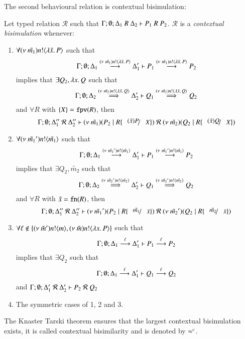 The second behavioural relation is contextual bisimulation:
%
\begin{definition}\rm
	Let typed relation $\mathcal{R}$ such that
	$\horel{\Gamma}{\Delta_1}{P_1}{\ R\ }{\Delta_2}{P_2}$.
	$\mathcal{R}$ is a {\em contextual bisimulation} whenever:
	\begin{enumerate}
		\item	$\forall \news{\tilde{m_1}} \bactout{n}{\abs{\tilde{x}}{P}}$ such that
			\[
				\horel{\Gamma}{\Delta_1}{P_1}{\by{\news{\tilde{m_1}} \bactout{n}{\abs{\tilde{x}}{P}}}}{\Delta_1'}{P_2}
			\]
			implies that $\exists Q_2, \abs{x}{Q}$ such that
			\[
				\horel{\Gamma}{\Delta_2}{Q_1}{\By{\news{\tilde{m_2}} \bactout{n}{\abs{\tilde{x}}{Q}}}}{\Delta_2'}{Q_2}
			\]
			and $\forall R$ with $\set{X} = \fpv{R}$, %
			then
			\[
				\horel{\Gamma}{\Delta_1''}{\newsp{\tilde{m_1}}{P_2 \Par R\subst{(\tilde{x}) P}{X}}}
				{\ \mathcal{R}\ }
				{\Delta_2''}{\newsp{\tilde{m_2}}{Q_2 \Par R\subst{(\tilde{x}) Q}{X}}}
			\]
		\item	$\forall \news{\tilde{m_1}'} \bactout{n}{\tilde{m_1}}$ such that
			\[
				\horel{\Gamma}{\Delta_1}{P_1}{\by{\news{\tilde{m_1}'} \bactout{n}{\tilde{m_1}}}}{\Delta_1'}{P_2}
			\]
			implies that $\exists Q_2, \tilde{m_2}$ such that
			\[
				\horel{\Gamma}{\Delta_2}{Q_1}{\By{\news{\tilde{m_2}'} \bactout{n}{\tilde{m_2}}}}{\Delta_2'}{Q_2}
			\]
			and $\forall R$ with $\tilde{x} = \fn{R}$, %
			then
			\[
				\horel{\Gamma}{\Delta_1''}{\newsp{\tilde{m_1}'}{P_2 \Par R \subst{\tilde{m_1}}{\tilde{x}}}}
				{\ \mathcal{R}\ }
				{\Delta_2''}{\newsp{\tilde{m_2}'}{Q_2 \Par R \subst{\tilde{m_2}}{\tilde{x}}}}
			\]

		\item	$\forall \ell \notin \set{\news{\tilde{m}'} \bactout{n}{m}, \news{\tilde{m}} \bactout{n}{\abs{x}{P}}}$ such that
			\[
				\horel{\Gamma}{\Delta_1}{P_1}{\by{\ell}}{\Delta_1'}{P_2}
			\]
			implies that $\exists Q_2$ such that 
			\[
				\horel{\Gamma}{\Delta_1}{Q_1}{\by{\ell}}{\Delta_1'}{Q_2}
			\]
			and
			$\horel{\Gamma}{\Delta_1'}{P_2}{\ \mathcal{R}\ }{\Delta_2'}{Q_2}$

		\item	The symmetric cases of 1, 2 and 3.
	\end{enumerate}
	The Knaster Tarski theorem ensures that the largest contextual bisimulation exists,
	it is called contextual bisimilarity and is denoted by $\wb^c$.
\end{definition}

